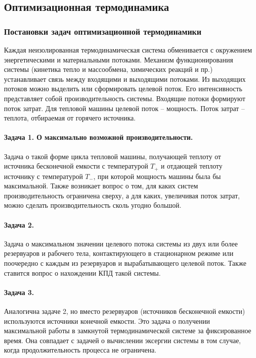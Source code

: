 \documentclass{article}
\begin{document}
	\subsection{Оптимизационная термодинамика}
	
		\subsubsection{Постановки задач оптимизационной термодинамики}
		
		Каждая неизолированная термодинамическая система  обменивается с окружением энергетическими и материальными потоками. Механизм функционирования системы (кинетика тепло и массообмена, химических реакций и пр.) устанавливает связь между входящими и выходящими потоками. Из выходящих потоков можно выделить или сформировать целевой поток. Его интенсивность представляет собой производительность системы. Входящие потоки формируют поток затрат. Для тепловой машины целевой поток – мощность. Поток затрат – теплота, отбираемая от горячего источника.
		
		\paragraph{Задача 1. О максимально возможной производительности.} Задача о такой форме цикла тепловой машины, получающей теплоту от источника бесконечной емкости с температурой $T_+$ и отдающей теплоту источнику с температурой $T_-$, при которой мощность машины была бы максимальной. Также возникает вопрос о том, для каких систем производительность ограничена сверху, а для каких, увеличивая поток затрат, можно сделать производительность сколь угодно большой.
		
		\paragraph{Задача 2.} Задача о максимальном значении целевого потока системы из двух или более резервуаров и рабочего тела, контактирующего в стационарном режиме или поочередно с каждым из резервуаров и вырабатывающего целевой поток. Также ставится вопрос о нахождении КПД такой системы.
				
		\paragraph{Задача 3.} Аналогична задаче 2, но вместо резервуаров (источников бесконечной емкости) используются источники конечной емкости. Это задача о получении максимальной работы	в замкнутой термодинамической системе за фиксированное время. Она совпадает с задачей о вычислении эксергии системы в том случае, когда продолжительность процесса не ограничена.
		
\end{document}
